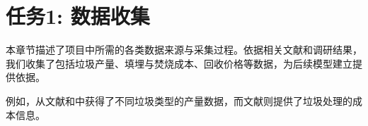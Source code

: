 \section{任务1: 数据收集}
本章节描述了项目中所需的各类数据来源与采集过程。依据相关文献和调研结果，我们收集了包括垃圾产量、填埋与焚烧成本、回收价格等数据，为后续模型建立提供依据。

例如，从文献\cite{Chen2018}和\cite{Ma2019}中获得了不同垃圾类型的产量数据，而文献\cite{Gao2018}则提供了垃圾处理的成本信息。
